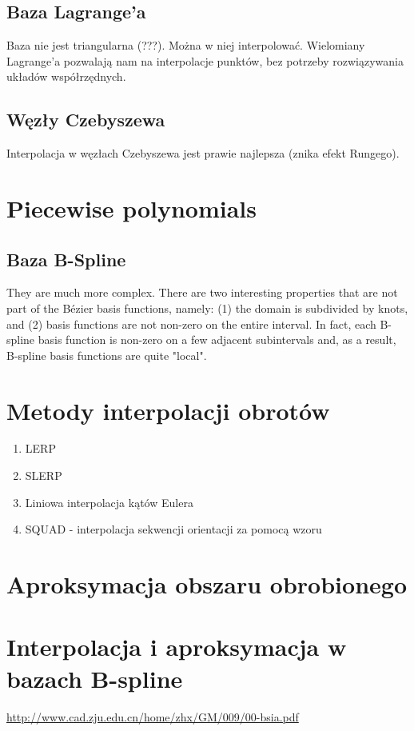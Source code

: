 \documentclass[12pt]{article}
\begin{document}
\subsection{Baza Lagrange'a}
Baza nie jest triangularna (???). Można w niej interpolować.
Wielomiany Lagrange'a pozwalają nam na interpolacje punktów, bez potrzeby rozwiązywania układów współrzędnych.
\subsection{Węzły Czebyszewa}
Interpolacja w węzłach Czebyszewa jest prawie najlepsza (znika efekt Rungego).

\section{Piecewise polynomials}
\subsection{Baza B-Spline}
They are much more complex. There are two interesting properties that are not part of the Bézier basis functions, namely: (1) the domain is subdivided by knots, and (2) basis functions are not non-zero on the entire interval. In fact, each B-spline basis function is non-zero on a few adjacent subintervals and, as a result, B-spline basis functions are quite "local".

\setcounter{section}{22}
\section{Metody interpolacji obrotów}
\begin{enumerate}
	\item LERP
	\item SLERP
	\item Liniowa interpolacja kątów Eulera
	\item SQUAD - interpolacja sekwencji orientacji za pomocą wzoru
\end{enumerate}

\section{Aproksymacja obszaru obrobionego}

\setcounter{section}{34}
\section{Interpolacja i aproksymacja w bazach B-spline}
\hyperlink{Prezentacja}{http://www.cad.zju.edu.cn/home/zhx/GM/009/00-bsia.pdf} 
\end{document}

